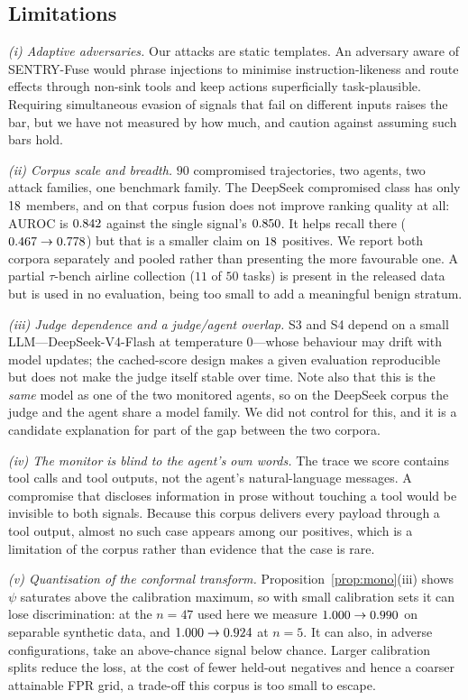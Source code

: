 \documentclass[pdflatex,sn-basic]{sn-jnl}%
\theoremstyle{thmstyleone}
\theoremstyle{thmstyletwo}
\theoremstyle{thmstylethree}
\begin{document}
\subsection{Limitations}\label{sec:limitations}

\emph{(i) Adaptive adversaries.} Our attacks are static templates. An adversary
aware of SENTRY-Fuse would phrase injections to minimise instruction-likeness
and route effects through non-sink tools and keep actions
superficially task-plausible. Requiring simultaneous evasion of signals that fail
on different inputs raises the bar, but we have not measured by how much, and
\citet{nasr2025attackersecond} caution against assuming such bars hold.

\emph{(ii) Corpus scale and breadth.} $90$ compromised trajectories, two agents,
two attack families, one benchmark family. The DeepSeek compromised class has only
$18$ members, and on that corpus fusion does not improve ranking quality at
all: $\mathrm{AUROC}$ is $0.842$ against the single signal's
$0.850$. It helps recall there ($0.467 \to 0.778$) but that is
a smaller claim on $18$ positives. We report both corpora separately and
pooled rather than presenting the more favourable one. A partial
$\tau$-bench airline collection ($11$ of $50$ tasks) is present in the released
data but is used in no evaluation, being too small to add a meaningful benign
stratum.

\emph{(iii) Judge dependence and a judge/agent overlap.} S3 and S4 depend on a
small LLM---DeepSeek-V4-Flash at temperature $0$---whose behaviour may drift with
model updates; the cached-score design makes a given evaluation reproducible but
does not make the judge itself stable over time. Note also that this is the
\emph{same} model as one of the two monitored agents, so on the DeepSeek corpus
the judge and the agent share a model family. We did not control for this, and it
is a candidate explanation for part of the gap between the two corpora.

\emph{(iv) The monitor is blind to the agent's own words.} The trace we score
contains tool calls and tool outputs, not the agent's natural-language messages.
A compromise that discloses information in prose without touching a tool would be
invisible to both signals. Because this corpus delivers every payload through a
tool output, almost no such case appears among our positives, which is a
limitation of the corpus rather than evidence that the case is rare.

\emph{(v) Quantisation of the conformal transform.}
Proposition~\ref{prop:mono}(iii) shows $\psi$ saturates above the calibration
maximum, so with small calibration sets it can lose discrimination: at the $n=47$
used here we measure $1.000 \to 0.990$ on separable synthetic data, and
$1.000 \to 0.924$ at $n=5$. It can also, in adverse configurations, take an above-chance signal below
chance. Larger calibration splits reduce the loss, at the cost of fewer held-out
negatives and hence a coarser attainable FPR grid, a trade-off this corpus is too
small to escape.
\end{document}
